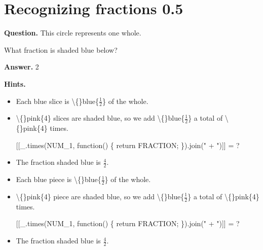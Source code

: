\documentclass{article}
\begin{document}
\section*{Recognizing fractions 0.5}
\textbf{Question.} This circle represents one whole.
                            
                        
                        
                            What fraction is shaded blue below?

\textbf{Answer.} 2

\textbf{Hints.}
\begin{itemize}
  \item Each blue slice is \textbackslash\{\}blue\{$\frac{1}{2}$\} of the whole.
  \item \textbackslash\{\}pink\{4\} slices are shaded blue, so we add
                            \textbackslash\{\}blue\{$\frac{1}{2}$\} a total of \textbackslash\{\}pink\{4\} times.
                        
                        [[\_.times(NUM\_1, function() \{ return FRACTION; \}).join(" + ")]] = ?
  \item The fraction shaded blue is $\frac{4}{2}$.
  \item Each blue piece is \textbackslash\{\}blue\{$\frac{1}{2}$\} of the whole.
  \item \textbackslash\{\}pink\{4\} piece are shaded blue, so we add
                            \textbackslash\{\}blue\{$\frac{1}{2}$\} a total of \textbackslash\{\}pink\{4\} times.
                        
                        [[\_.times(NUM\_1, function() \{ return FRACTION; \}).join(" + ")]] = ?
  \item The fraction shaded blue is $\frac{4}{2}$.
\end{itemize}
\end{document}
